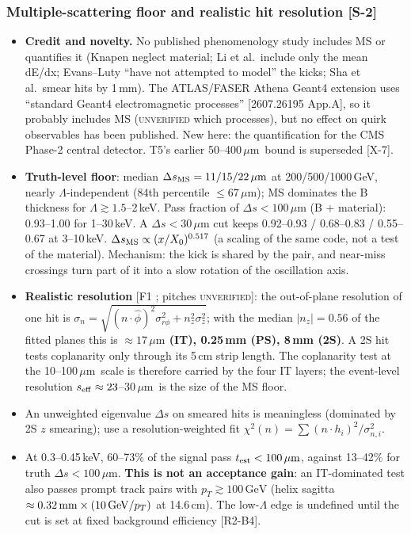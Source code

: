 \documentclass[11pt,a4paper]{article}
\newcommand{\UNV}{\textsc{unverified}}
\DeclareRobustCommand{\file}[1]{\path{#1}}
\newcommand{\GeV}{\ensuremath{\,\mathrm{GeV}}}
\newcommand{\um}{\ensuremath{\,\mu\mathrm{m}}}
\newcommand{\Ds}{\Delta s}
\newcommand{\src}[1]{{\color{mid}[#1]}}
\begin{document}
\subsubsection{Multiple-scattering floor and realistic hit resolution \src{S-2}}
\begin{itemize}
\item \textbf{Credit and novelty.} No published phenomenology study includes MS or quantifies it (Knapen neglect material; Li et al.\ include only the mean dE/dx; Evans--Luty ``have not attempted to model'' the kicks; Sha et al.\ smear hits by 1\,mm). The ATLAS/FASER Athena Geant4 extension uses ``standard Geant4 electromagnetic processes'' [2607.26195 App.A], so it probably includes MS (\UNV{} which processes), but no effect on quirk observables has been published. New here: the quantification for the CMS Phase-2 central detector. T5's earlier 50--400\um\ bound is superseded \src{X-7}.
\item \textbf{Truth-level floor}: median $\Ds_{\rm MS}=11/15/22\um$ at 200/500/1000\,GeV, nearly $\Lambda$-independent (84th percentile $\le67\um$); MS dominates the B thickness for $\Lambda\gtrsim1.5$--2\,keV. Pass fraction of $\Ds<100\um$ (B + material): 0.93--1.00 for 1--30\,keV. A $\Ds<30\um$ cut keeps 0.92--0.93 / 0.68--0.83 / 0.55--0.67 at 3--10\,keV. $\Ds_{\rm MS}\propto(x/X_0)^{0.517}$ (a scaling of the same code, not a test of the material). Mechanism: the kick is shared by the pair, and near-miss crossings turn part of it into a slow rotation of the oscillation axis.
\item \textbf{Realistic resolution} [F1 \file{F1_smear.py}; pitches \UNV{}]: the out-of-plane resolution of one hit is $\sigma_n=\sqrt{(n\cdot\hat\phi)^2\sigma_{r\phi}^2+n_z^2\sigma_z^2}$; with the median $|n_z|=0.56$ of the fitted planes this is \textbf{$\approx17\um$ (IT), 0.25\,mm (PS), 8\,mm (2S)}. A 2S hit tests coplanarity only through its 5\,cm strip length. The coplanarity test at the 10--100\um\ scale is therefore carried by the four IT layers; the event-level resolution $s_{\rm eff}\approx23$--30\um\ is the size of the MS floor.
\item An unweighted eigenvalue $\Ds$ on smeared hits is meaningless (dominated by 2S $z$ smearing); use a resolution-weighted fit $\chi^2(n)=\sum(n\cdot h_i)^2/\sigma_{n,i}^2$.
\item At 0.3--0.45\,keV, 60--73\% of the signal pass $t_{\rm est}<100\um$, against 13--42\% for truth $\Ds<100\um$. \textbf{This is not an acceptance gain}: an IT-dominated test also passes prompt track pairs with $p_T\gtrsim100\GeV$ (helix sagitta $\approx0.32\,{\rm mm}\times(10\GeV/p_T)$ at 14.6\,cm). The low-$\Lambda$ edge is undefined until the cut is set at fixed background efficiency [R2-B4].
\end{itemize}
\end{document}
